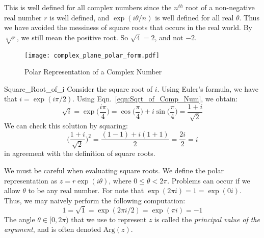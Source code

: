     This is well defined for all complex numbers since the $n^{th}$
    root of a non-negative real number $r$ is well defined, and
    $\exp(i\theta/n)$ is well defined for all real $\theta$. Thus we
    have avoided the messiness of square roots that occurs in the real
    world. By $\sqrt[n]{r}$, we still mean the positive root.
    So $\sqrt{4}=2$, and not $\minus{2}$.
    \begin{figure}[H]
        \centering
        \captionsetup{type=figure}
        \texttt{[image: complex\_plane\_polar\_form.pdf]}
        \caption{Polar Representation of a Complex Number}
        \label{fig:Comp_Num_Polar}
    \end{figure}
    \begin{lexample}{}{Square_Root_of_i}
        Consider the square root of $i$. Using Euler's formula, we
        have that $i=\exp(i\pi/2)$. Using
        Eqn.~\ref{eqn:Sqrt_of_Comp_Num}, we obtain:
        \begin{equation}
            \sqrt{i}=\exp\big(\frac{i\pi}{4}\big)
                    =\cos\big(\frac{\pi}{4}\big)
                        +i\sin\big(\frac{\pi}{4}\big)
                    =\frac{1+i}{\sqrt{2}}
        \end{equation}
        We can check this solution by squaring:
        \begin{equation}
            \Big(\frac{1+i}{\sqrt{2}}\Big)^{2}=\frac{(1-1)+i(1+1)}{2}
                                              =\frac{2i}{2}
                                              =i
        \end{equation}
        in agreement with the definition of square roots.
    \end{lexample}
    We must be careful when evaluating square roots. We define the polar
    representation as $z=r\exp(i\theta)$, where
    $0\leq\theta<2\pi$. Problems can occur if we allow $\theta$ to be
    any real number. For note that $\exp(2\pi{i})=1=\exp(0i)$. Thus, we
    may naively perform the following computation:
    \begin{equation}
        1=\sqrt{1}=\exp(2\pi{i}/2)=\exp(\pi{i})=\minus{1}
    \end{equation}
    The angle $\theta\in[0,2\pi)$ that we use to represent $z$ is called
    the \textit{principal value of the argument}, and is often denoted
    $\mathrm{Arg}(z)$.
